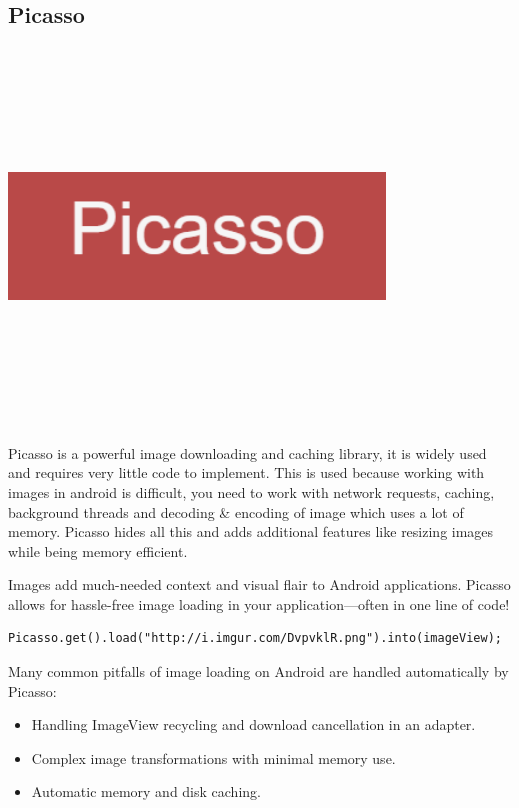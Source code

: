 \subsection{Picasso}
\par
\medskip
\begin{center}
    \includegraphics[width=10cm,height=10cm,keepaspectratio]{Images/picasso.png}
\end{center}
Picasso is a powerful image downloading and caching library, it is widely used and requires very little code to implement.
This is used because working with images in android is difficult, you need to work with network requests, caching, background threads and decoding \& encoding of image which uses a lot of memory. Picasso hides all this and adds additional features like resizing images while being memory efficient.\newline

Images add much-needed context and visual flair to Android applications. Picasso allows for hassle-free image loading in your application—often in one line of code!

\begin{lstlisting}
Picasso.get().load("http://i.imgur.com/DvpvklR.png").into(imageView);
\end{lstlisting}


Many common pitfalls of image loading on Android are handled automatically by Picasso:
\begin{itemize}
    \item Handling ImageView recycling and download cancellation in an adapter.
    \item Complex image transformations with minimal memory use.
    \item Automatic memory and disk caching.
\end{itemize}


